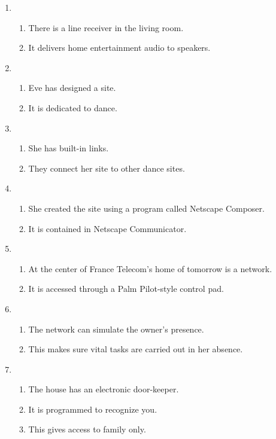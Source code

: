 \documentclass[a4paper]{article}
\begin{document}
\begin{enumerate}[label={\textbf{\Roman*.}},leftmargin=0pt,itemindent=*]
\begin{enumerate}[label=\arabic*.,itemsep=0pt]
      \item \begin{enumerate}[label=\alph*)]
        \item There is a line receiver in the living room.
        \item It delivers home entertainment audio to speakers.
      \end{enumerate}

      \item \begin{enumerate}[label=\alph*)]
        \item Eve has designed a site.
        \item It is dedicated to dance.
      \end{enumerate}

      \item \begin{enumerate}[label=\alph*)]
        \item She has built-in links.
        \item They connect her site to other dance sites.
      \end{enumerate}

      \item \begin{enumerate}[label=\alph*)]
        \item She created the site using a program called Netscape Composer.
        \item It is contained in Netscape Communicator.
      \end{enumerate}

      \item \begin{enumerate}[label=\alph*)]
        \item At the center of France Telecom's home of tomorrow is a network.
        \item It is accessed through a Palm Pilot-style control pad.
      \end{enumerate}

      \item \begin{enumerate}[label=\alph*)]
        \item The network can simulate the owner's presence.
        \item This makes sure vital tasks are carried out in her absence.
      \end{enumerate}

      \item \begin{enumerate}[label=\alph*)]
        \item The house has an electronic door-keeper.
        \item It is programmed to recognize you.
        \item This gives access to family only.
      \end{enumerate}


\end{enumerate}
\end{enumerate}
\end{document}
